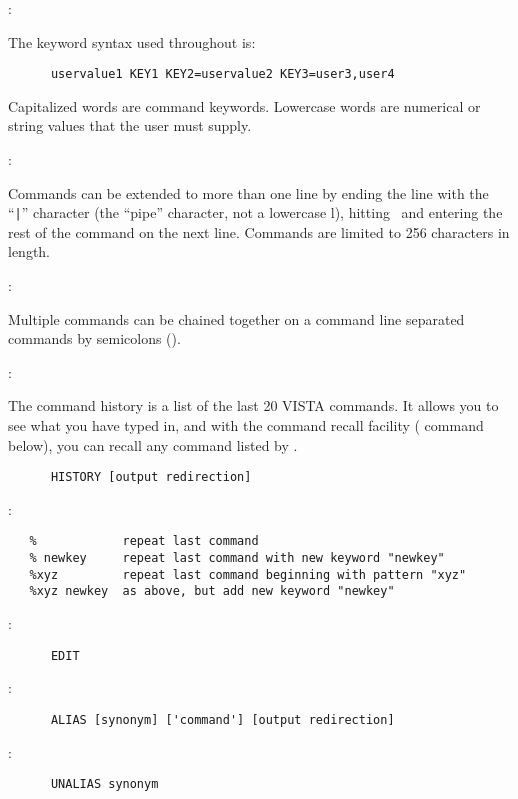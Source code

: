 \noindent {}:

The keyword syntax used throughout is:
\begin{verbatim}
      uservalue1 KEY1 KEY2=uservalue2 KEY3=user3,user4
\end{verbatim}
Capitalized words are command keywords.  Lowercase words are numerical or
string values that the user must supply.

\noindent {}:

Commands can be extended to more than one line by ending the line with the
``\verb+|+'' character (the ``pipe'' character, not a lowercase l), hitting
\ and entering the rest of the command on the next line.
Commands are limited to 256 characters in length.

\noindent {}:

Multiple commands can be chained together on a command line separated commands
by semicolons (\comm{;}).

\noindent {}:

The command history is a list of the last 20 VISTA commands.  It allows you to
see what you have typed in, and with the command recall facility (\comm{\%}
command below), you can recall any command listed by .

\begin{verbatim}
      HISTORY [output redirection]
\end{verbatim}

\noindent {}:
\begin{verbatim}
   %            repeat last command
   % newkey     repeat last command with new keyword "newkey"
   %xyz         repeat last command beginning with pattern "xyz"
   %xyz newkey  as above, but add new keyword "newkey"
\end{verbatim}

\noindent {}:
\begin{verbatim}
      EDIT
\end{verbatim}

\noindent {}:
\begin{verbatim}
      ALIAS [synonym] ['command'] [output redirection]
\end{verbatim}

\noindent {}:
\begin{verbatim}
      UNALIAS synonym
\end{verbatim}

